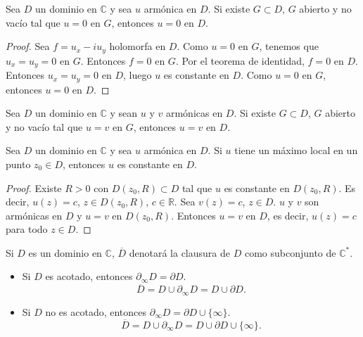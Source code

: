 \begin{theorem}
    Sea $D$ un dominio en $\mathbb{C}$ y sea $u$ armónica en $D$.
    Si existe $G \subset D$, $G$ abierto y no vacío tal que $u = 0$ en $G$, entonces $u = 0$ en $D$.
\end{theorem}

\begin{proof}
    Sea $f = u_x - iu_y$ holomorfa en $D$.
    Como $u = 0$ en $G$, tenemos que $u_x = u_y = 0$ en $G$.
    Entonces $f = 0$ en $G$.
    Por el teorema de identidad, $f = 0$ en $D$.
    Entonces $u_x = u_y = 0$ en $D$, luego $u$ es constante en $D$.
    Como $u = 0$ en $G$, entonces $u = 0$ en $D$.
\end{proof}

\begin{corollary}
    Sea $D$ un dominio en $\mathbb{C}$ y sean $u$ y $v$ armónicas en $D$.
    Si existe $G \subset D$, $G$ abierto y no vacío tal que $u = v$ en $G$, entonces $u = v$ en $D$.
\end{corollary}

\begin{theorem}
    Sea $D$ un dominio en $\mathbb{C}$ y sea $u$ armónica en $D$.
    Si $u$ tiene un máximo local en un punto $z_0 \in D$, entonces $u$ es constante en $D$.
\end{theorem}

\begin{proof}
    Existe $R > 0$ con $D(z_0, R) \subset D$ tal que $u$ es constante en $D(z_0, R)$.
    Es decir, $u(z) = c$, $z \in D(z_0, R)$, $c \in \mathbb{R}$.
    Sea $v(z) = c$, $z \in D$.
    $u$ y $v$ son armónicas en $D$ y $u = v$ en $D(z_0, R)$.
    Entonces $u = v$ en $D$, es decir, $u(z) = c$ para todo $z \in D$.
\end{proof}

\begin{notation}
    Si $D$ es un dominio en $\mathbb{C}$, $\overline{D}$ denotará la clausura de $D$ como subconjunto de $\mathbb{C}^\ast$.
    \begin{itemize}
        \item Si $D$ es acotado, entonces $\partial_\infty D = \partial D$.
              $$\overline{D} = D \cup \partial_\infty D = D \cup \partial D.$$
        \item Si $D$ no es acotado, entonces $\partial_\infty D = \partial D \cup \{\infty\}$.
              $$\overline{D} = D \cup \partial_\infty D = D \cup \partial D \cup \{\infty\}.$$
    \end{itemize}
\end{notation}

